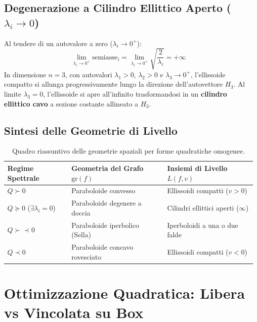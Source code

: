 \subsection{Degenerazione a Cilindro Ellittico Aperto (\texorpdfstring{$\lambda_i \to 0$}{lambda -> 0})}
Al tendere di un autovalore a zero ($\lambda_i \to 0^+$):
\begin{equation}
\lim_{\lambda_i \to 0^+} \text{semiasse}_i = \lim_{\lambda_i \to 0^+} \sqrt{\frac{2}{\lambda_i}} = +\infty
\end{equation}
In dimensione $n = 3$, con autovalori $\lambda_1 > 0$, $\lambda_2 > 0$ e $\lambda_3 \to 0^+$, l'ellissoide compatto si allunga progressivamente lungo la direzione dell'autovettore $H_3$. Al limite $\lambda_3 = 0$, l'ellissoide si apre all'infinito trasformandosi in un \textbf{cilindro ellittico cavo} a sezione costante allineato a $H_3$.

\subsection{Sintesi delle Geometrie di Livello}
\begin{table}[H]
\centering
\small
\renewcommand{\arraystretch}{1.3}
\begin{tabularx}{\textwidth}{l X X}
\toprule
\textbf{Regime Spettrale} & \textbf{Geometria del Grafo $\text{gr}(f)$} & \textbf{Insiemi di Livello $L(f, v)$} \\
\midrule
$Q \succ 0$ & Paraboloide convesso & Ellissoidi compatti ($v > 0$) \\
$Q \succeq 0$ ($\exists \lambda_i = 0$) & Paraboloide degenere a doccia & Cilindri ellittici aperti ($\infty$) \\
$Q \succ\prec 0$ & Paraboloide iperbolico (Sella) & Iperboloidi a una o due falde \\
$Q \prec 0$ & Paraboloide concavo rovesciato & Ellissoidi compatti ($v < 0$) \\
\bottomrule
\end{tabularx}
\caption{Quadro riassuntivo delle geometrie spaziali per forme quadratiche omogenee.}
\label{tab:geometrie-livello}
\end{table}


\FloatBarrier
\section{Ottimizzazione Quadratica: Libera vs Vincolata su Box}
\label{sec:opt-quadratica-libera-vs-box-np}


